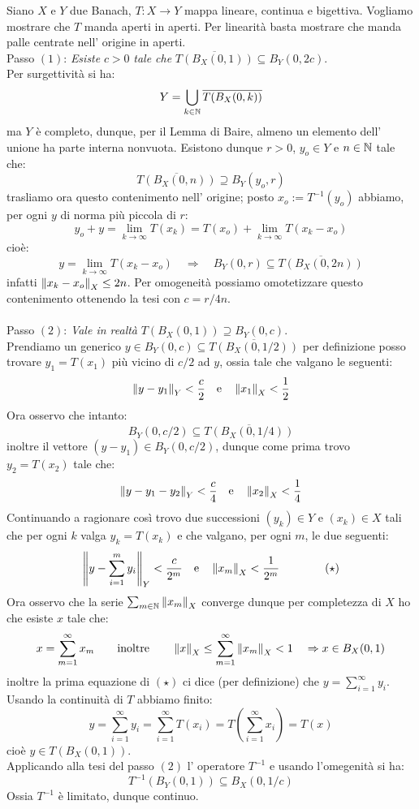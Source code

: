  Siano $X$ e $Y$ due Banach, $T:X\rightarrow Y$ mappa lineare, continua e bigettiva. Vogliamo mostrare che $T$ manda aperti in aperti. Per linearità basta mostrare che manda palle centrate nell' origine in aperti.\\
Passo $(1)$: {\it Esiste} $c>0$ {\it tale che} $\overline{T(B_X (0,1))} \subseteq B_Y (0, 2c)$.\\
Per surgettività si ha:
$$
Y=\bigcup_{k\in\mathbb{N}} {\overline{T(B_X (0,k))}}
$$
ma $Y$ è completo, dunque, per il Lemma di Baire, almeno un elemento dell' unione ha parte interna nonvuota. Esistono dunque $r>0$, $y_o\in Y$ e $n\in\mathbb{N}$ tale che:
$$
\overline{T(B_X (0,n))}\supseteq B_Y(y_o,r) 
$$
trasliamo ora questo contenimento nell' origine; posto $x_o:=T^{-1}(y_o)$ abbiamo, per ogni $y$ di norma più piccola di $r$:
$$
y_o+y=\lim_{k\rightarrow \infty} T(x_k)=T(x_o)+ \lim_{k\rightarrow \infty} T(x_k-x_o)
$$
cioè:
$$
y=\lim_{k\rightarrow \infty} T(x_k-x_o)\quad \Rightarrow\quad B_Y(0,r)\subseteq \overline{T(B_X(0,2n))}
$$
infatti $\left \| x_k-x_o \right\|_X\leq 2n$. Per omogeneità possiamo omotetizzare questo contenimento ottenendo la tesi con $c=r/4n$.\\
\\
Passo $(2)$: {\it Vale in realtà} $T(B_X(0,1))\supseteq B_Y(0,c)$.\\
Prendiamo un generico $y\in B_Y(0,c)\subseteq \overline{T(B_X(0,1/2))}$ per definizione posso trovare $y_1=T(x_1)$ più vicino di $c/2$ ad $y$, ossia tale che valgano le seguenti:
$$
\left \| y-y_1 \right\|_Y<\frac{c}{2}\quad \mbox{e}\quad \left \| x_1 \right\|_X<\frac{1}{2}
$$
Ora osservo che intanto:
$$
B_Y(0,c/2)\subseteq \overline{T(B_X(0,1/4))}
$$
inoltre il vettore $(y-y_1)\in B_Y(0,c/2)$, dunque come prima trovo $y_2=T(x_2)$ tale che:
$$
\left \| y-y_1-y_2 \right\|_Y<\frac{c}{4}\quad \mbox{e}\quad \left \| x_2 \right\|_X<\frac{1}{4}
$$
Continuando a ragionare così trovo due successioni $(y_k)\in Y$ e $(x_k)\in X$ tali che per ogni $k$ valga $y_k=T(x_k)$ e che valgano, per ogni $m$, le due seguenti:
$$
\left \| y-\sum_{i=1}^m y_{i} \right\|_Y<\frac{c}{2^m}\quad \mbox{e}\quad \left \| x_m \right\|_X<\frac{1}{2^m}\qquad\qquad (\star)
$$
Ora osservo che la serie $\sum_{m\in\mathbb{N}}\left \| x_m \right\|_X$ converge dunque per completezza di $X$ ho che esiste $x$ tale che:
$$
x=\sum_{m=1}^{\infty} x_m\qquad \mbox{inoltre} \qquad \left \| x \right\|_X\leq\sum_{m=1}^{\infty} \left \| x_m \right\|_X<1\quad \Rightarrow x\in B_X(0,1)
$$
inoltre la prima equazione di $(\star)$ ci dice (per definizione) che $y=\sum_{i=1}^{\infty}y_i$. Usando la continuità di $T$ abbiamo finito:
$$
y=\sum_{i=1}^{\infty}y_i=\sum_{i=1}^{\infty}T(x_i)=T\left(\sum_{i=1}^{\infty}x_i\right)=T(x)
$$
cioè $y\in T(B_X(0,1))$.\\
Applicando alla tesi del passo $(2)$ l' operatore $T^{-1}$ e usando l'omegenità si ha:
$$
T^{-1}(B_Y(0,1))\subseteq B_X(0,1/c)
$$
Ossia $T^{-1}$ è limitato, dunque continuo.
